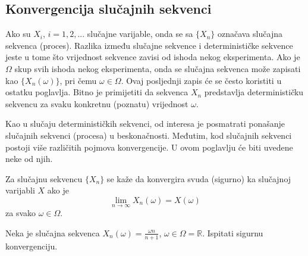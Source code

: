 \subsection{Konvergencija slučajnih sekvenci}

Ako su $X_i$, $i=1,2,...$ slučajne varijable, onda se sa $\{X_n\}$ označava
slučajna sekvenca (proces). Razlika između slučajne sekvence i determinističke
sekvence jeste u tome što vrijednost sekvence zavisi od ishoda nekog
eksperimenta.  Ako je $\Omega$ skup svih ishoda nekog eksperimenta, onda se
slučajna sekvenca može zapisati kao $\{X_n(\omega)\}$, pri čemu $\omega \in
\Omega$. Ovaj posljednji zapis će se često koristiti u ostatku poglavlja. Bitno
je primijetiti da sekvenca $X_n$ predstavlja determinističku sekvencu za
svaku konkretnu (poznatu) vrijednost $\omega$.

Kao u slučaju determinističkih sekvenci, od interesa je posmatrati ponašanje
slučajnih sekvenci (procesa) u beskonačnosti. Međutim, kod slučajnih sekvenci
postoji više različitih pojmova konvergencije. U ovom poglavlju će biti uvedene
neke od njih. 

\begin{definition}
  Za slučajnu sekvencu $\{X_n\}$ se kaže da konvergira svuda (sigurno) ka
  slučajnoj varijabli $X$ ako je
  \begin{equation}
    \lim_{n\to\infty} X_n(\omega) = X(\omega)
  \end{equation}
  za svako $\omega \in \Omega$.
\end{definition}




\begin{exmp}
  Neka je slučajna sekvenca $X_n(\omega) = \frac{\omega n}{n+1}$, $\omega \in
  \Omega = \mathbb{R}$. Ispitati sigurnu konvergenciju.
\end{exmp}

